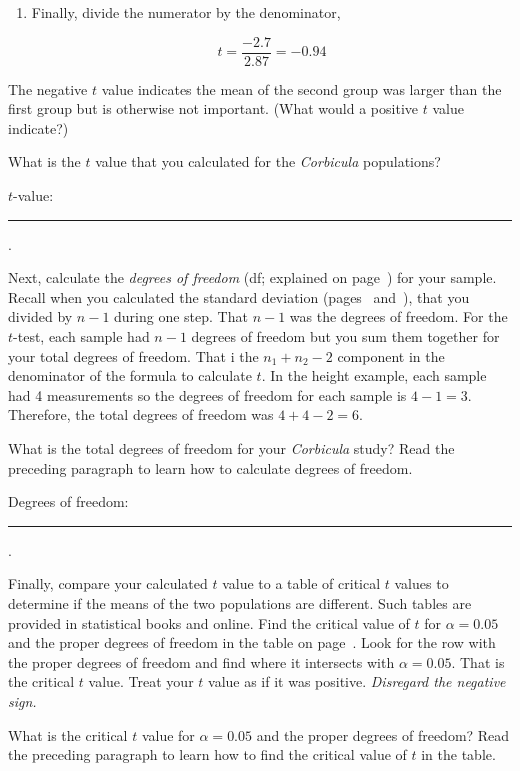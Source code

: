 \documentclass[12pt]{exam}
\newcommand*\Corbicula{\textit{Corbicula}}
\newcommand*\AnswerBlank{\rule{0.75in}{0.4pt}\kern0.67pt.}
\begin{document}
\begin{questions}
\begin{enumerate}

\item Finally, divide the numerator by the denominator,

\begin{equation*}
	t = \frac{-2.7}{2.87} = -0.94
\end{equation*}

\end{enumerate}

The negative $t$ value indicates the mean of the second group was larger than the first group but is otherwise not important. (What would a positive $t$ value indicate?) 

\question
What is the $t$ value that you calculated for the \Corbicula{} populations?\label{final_t_value} \bigskip

$t$-value:  \AnswerBlank{}

\bigskip

Next, calculate the \emph{degrees of freedom} (df; explained on page~\pageref{degrees_freedom}) for your sample. Recall  when you calculated the standard deviation (pages~\pageref{tab:height_sd} and~\pageref{tab:sdA}), that you divided by $n-1$ during one step. That $n-1$ was the degrees of freedom. For the $t$-test, each sample had $n-1$ degrees of freedom but you sum them together for your total degrees of freedom. That i the $n_1 + n_2 -2$ component in the denominator of the formula to calculate $t$. In the height example, each sample had 4 measurements so the degrees of freedom for each sample is $4-1 = 3$. Therefore, the total degrees of freedom was $4 + 4 - 2 = 6$.

\question
What is the total degrees of freedom for your \Corbicula{} study? Read the preceding paragraph to learn how to calculate degrees of freedom.\bigskip

Degrees of freedom:  \AnswerBlank{}

\bigskip


Finally, compare your calculated $t$ value to a table of critical $t$ values to determine if the means of the two populations are different. Such tables are provided in statistical books and online. Find the critical value of $t$ for $\alpha = 0.05$ and the proper degrees of  freedom in the table on page~\pageref{tab:ttable}. Look for the row with the proper degrees of freedom and find where it intersects with $\alpha = 0.05$. That is the critical $t$ value. Treat your $t$ value as if it was positive. \emph{Disregard the negative sign.}  

\question 
What is the critical $t$ value for $\alpha = 0.05$ and the proper degrees of freedom? Read the preceding paragraph to learn how to find the critical value of $t$ in the table. \bigskip


\end{questions}
\end{document}
